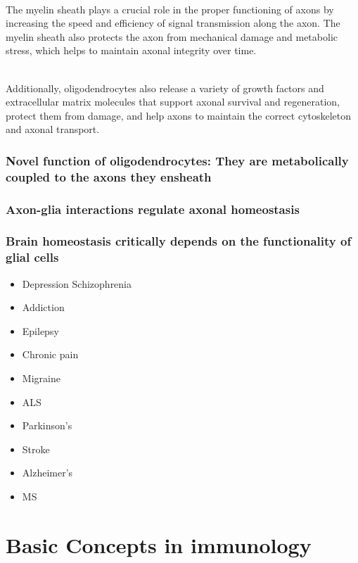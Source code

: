 \begin{itemize}
\begin{itemize}
\\The myelin sheath plays a crucial role in the proper functioning of axons by increasing the speed and efficiency of signal transmission along the axon. The myelin sheath also protects the axon from mechanical damage and metabolic stress, which helps to maintain axonal integrity over time.

\\Additionally, oligodendrocytes also release a variety of growth factors and extracellular matrix molecules that support axonal survival and regeneration, protect them from damage, and help axons to maintain the correct cytoskeleton and axonal transport.
\subsubsection{Novel function of oligodendrocytes: They are metabolically coupled to the axons they ensheath}

\subsubsection{Axon-glia interactions regulate axonal homeostasis}
\subsubsection{Brain homeostasis critically depends on the functionality of glial cells}
\begin{itemize}
    \item Depression
    Schizophrenia
    \item Addiction
    \item Epilepsy
    \item Chronic pain
    \item Migraine
    \item ALS
    \item Parkinson's
    \item Stroke
    \item Alzheimer's
    \item MS
\end{itemize}

\section{Basic Concepts in immunology}

\end{itemize}
\end{itemize}
